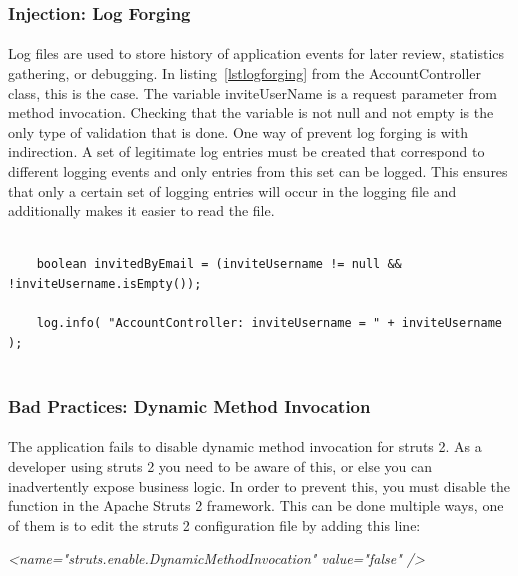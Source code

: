 \documentclass[11pt,english,a4paper]{report}
\begin{document}
\subsubsection{Injection: Log Forging}
\paragraph{}
Log files are used to store history of application events for later review, statistics gathering, or debugging.
In listing~\ref{lstlogforging} from the AccountController class, this is the case.
The variable inviteUserName is a request parameter from method invocation. 
Checking that the variable is not null and not empty is the only type of validation that is done. 
One way of prevent log forging is with indirection.
A set of legitimate log entries must be created that correspond to different logging events and only entries from this set can be logged.
This ensures that only a certain set of logging entries will occur in the logging file and additionally makes it easier to read the file.

\begin{lstlisting}[caption=Log forging in the AccountController class, label=lstlogforging]
	
	boolean invitedByEmail = (inviteUsername != null && !inviteUsername.isEmpty());

	log.info( "AccountController: inviteUsername = " + inviteUsername );


\end{lstlisting}

\subsubsection{Bad Practices: Dynamic Method Invocation}
\paragraph{}
The application fails to disable dynamic method invocation for struts 2.
As a developer using struts 2 you need to be aware of this, or else you can inadvertently expose business logic.
In order to prevent this, you must disable the function in the Apache Struts 2 framework.
This can be done multiple ways, one of them is to edit the struts 2 configuration file by adding this line:
\begin{center}
	\textit{\textless name="struts.enable.DynamicMethodInvocation" value="false" /\textgreater }

\end{center}
\end{document}
